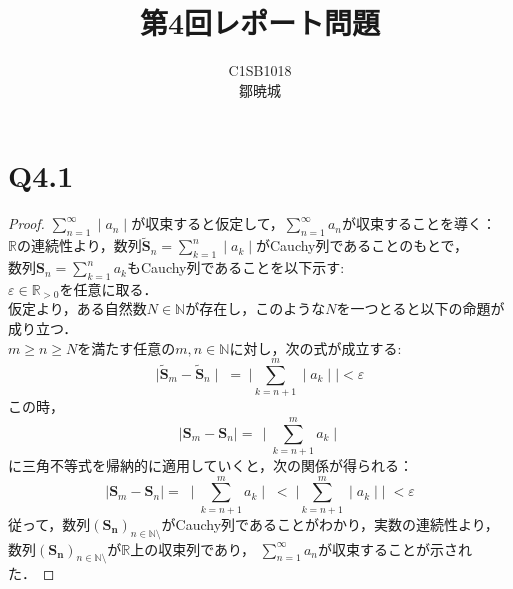 \documentclass{jarticle}
\begin{document}
\title{第4回レポート問題}
\author{C1SB1018 \\鄒暁城}
\maketitle
\section*{Q4.1}
\begin{proof}
$\sum\limits_{n=1}^{\infty} \mid a_{n} \mid$が収束すると仮定して，$\sum\limits_{n=1}^{\infty} a_{n} $が収束することを導く：\\
$\mathbb{R}$の連続性より，数列$ \mathbf{\widetilde{S}}_{n} = \sum\limits_{k=1}^{n} \mid a_{k} \mid$がCauchy列であることのもとで，\\
数列$\mathbf{S}_{n} = \sum\limits_{k=1}^{n} a_{k} $もCauchy列であることを以下示す:\\
$\varepsilon \in \mathbb{R}_{>0} $を任意に取る．\\
仮定より，ある自然数$N \in \mathbb{N}$が存在し，このような$N$を一つとると以下の命題が成り立つ．\\
$m \ge n \ge N$を満たす任意の$m,n \in \mathbb{N}$に対し，次の式が成立する:\\
$$
\mid \mathbf{\widetilde{S}}_{m} - \mathbf{\widetilde{S}}_{n} \mid \; = \;  \bm{\mid} \sum_{k=n+1}^{m} \mid a_{k} \mid \bm{\mid}< \varepsilon
$$
この時，\\
$$
\mid \mathbf{S}_{m} - \mathbf{S}_{n} \mid =\, \mid \sum_{k=n+1}^{m}  a_{k}  \mid
$$
に三角不等式を帰納的に適用していくと，次の関係が得られる：\\
$$
\mid \mathbf{S}_{m} - \mathbf{S}_{n} \mid =\; \mid \sum_{k=n+1}^{m}  a_{k}  \mid\; < \;\bm{\mid} \sum_{k=n+1}^{m} \mid a_{k} \mid \bm{\mid} \; < \varepsilon
$$
従って，数列$(\mathbf{S_{n}})_{n \in \mathbb{N}\setminus }$がCauchy列であることがわかり，実数の連続性より，数列$(\mathbf{S_{n}})_{n \in \mathbb{N}\setminus }$が$\mathbb{R}$上の収束列であり，
$\sum\limits_{n=1}^{\infty} a_{n} $が収束することが示された．
\end{proof}
\end{document}
